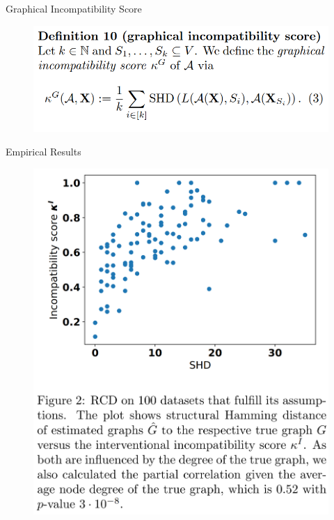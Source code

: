 \documentclass{beamer}
\begin{document}
\begin{frame}{Graphical Incompatibility Score}
	\begin{figure}
		\centering
		\includegraphics[scale=0.25]{imgs/def_10.png}
	\end{figure}
\end{frame}

\begin{frame}{Empirical Results}
	\begin{figure}
		\includegraphics[scale=0.12]{imgs/empirical1.png}
	\end{figure}
\end{frame}
\end{document}
